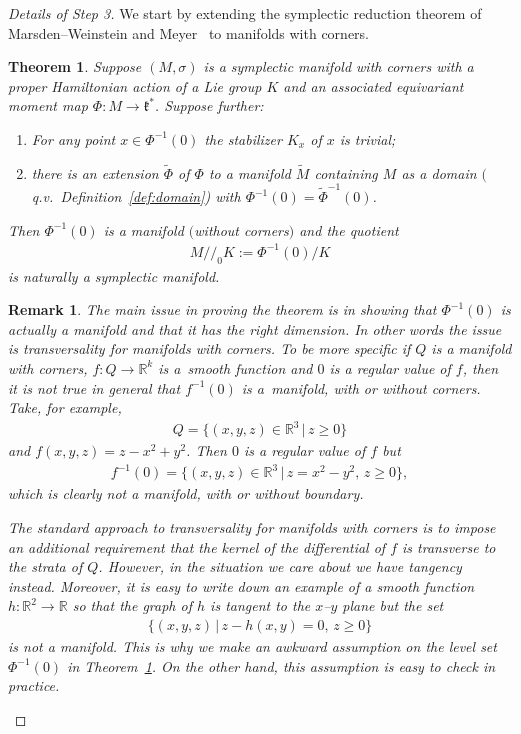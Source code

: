 \documentclass[pdftex]{sigma}
\numberwithin{equation}{section}
\newtheorem{Theorem}[Lemma]{Theorem}
\newtheorem{Remark}[Lemma]{Remark}
\begin{document}
\begin{proof}[Details of Step 3]
  We start by extending the symplectic reduction theorem of
  Marsden--Wein\-stein and Meyer~\cite{MW, Meyer} to manifolds with corners.

\begin{Theorem}\label{thm:red-corner}
  Suppose $(M,\sigma)$ is a symplectic manifold with corners with a proper
  Hamiltonian action of a Lie group $K$ and an associated equivariant
  moment map $\Phi\colon M\to{\mathfrak k}^*$.  Suppose further:
\begin{enumerate}[$1.$]\itemsep=0pt
\item For any point $x\in \Phi^{-1} (0)$ the stabilizer $K_x$ of $x$ is trivial;
\item there is an extension $\tilde{\Phi}$ of $\Phi$ to a manifold
  $\tilde{M}$ containing $M$ as a domain $($q.v.\
  Definition~{\rm \ref{def:domain})} with $\Phi^{-1} (0) = \tilde{\Phi}^{-1}
  (0)$.
\end{enumerate}
Then $\Phi^{-1} (0)$ is a manifold $($without corners$)$ and the quotient
\begin{gather*}
M/\!/_0 K:= \Phi^{-1} (0)/K
\end{gather*}
is naturally a symplectic manifold.
\end{Theorem}
\begin{Remark}
  The main issue in proving the theorem is in showing that $\Phi^{-1}
  (0)$ is actually a manifold and that it has the right dimension.  In
  other words the issue is transversality for manifolds with corners.
  To be more specif\/ic if $Q$ is a manifold with corners, $f\colon Q\to {\mathbb R}^k$
  is a~smooth function and $0$ is a regular value of $f$, then it is
  not true in general that $f^{-1} (0)$ is a~manifold, with or without
  corners. Take, for example,
\begin{gather*}
Q =\big\{(x,y,z)\in {\mathbb R}^3 \,|\, z\geq 0\big\}
\end{gather*}
and $f(x,y,z) = z-x^2 + y^2$.  Then $0$ is a regular value of $f$ but{\samepage
\begin{gather*}
f^{-1} (0) = \big\{(x,y,z)\in {\mathbb R}^3 \,|\,  z= x^2 -y^2,\,  z\geq 0\big\},
\end{gather*}
which is clearly not a manifold, with or without boundary.}

The standard approach to transversality for manifolds with
corners \cite{Nielsen} is to impose an additional requirement that the
kernel of the dif\/ferential of $f$ is transverse to the strata of $Q$.
However, in the situation we care about we have tangency instead.
Moreover, it is easy to write down an example of a smooth function
$h\colon {\mathbb R}^2\to {\mathbb R}$ so that the graph of $h$ is tangent to the $x$--$y$ plane
but the set
\begin{gather*}
\{(x,y,z)\,|\, z-h(x,y)=0,\, z\geq 0\}
\end{gather*}
is not a manifold.  This is why we make an awkward assumption on the
level set $\Phi^{-1} (0)$ in Theorem~\ref{thm:red-corner}.  On the other
hand, this assumption is easy to check in practice.
\end{Remark}


\end{proof}
\end{document}
